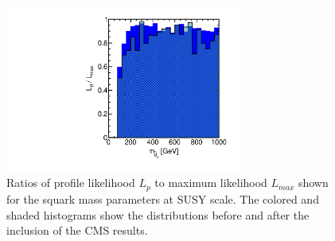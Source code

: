 \begin{figure}[htbp]
\begin{center}
\includegraphics[height=5.5cm]{figs/fig_m_d_3.pdf}
\caption{Ratios of profile likelihood $L_p$ to maximum likelihood $L_{max}$ shown for the squark mass parameters at SUSY scale.  The colored and shaded histograms show the distributions before and after the inclusion of the CMS results.}
\label{fig:LRwcms_msq}
\end{center}
\end{figure}


